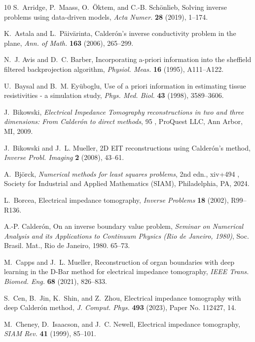 \documentclass[11pt]{article}
\begin{document}
\begin{thebibliography}{10}
	S.~Arridge, P.~Maass, O.~\"Oktem, and C.-B. Sch\"onlieb, Solving inverse
	problems using data-driven models, \textit{Acta Numer.} \textbf{28} (2019),
	1--174.
	
	K.~Astala and L.~P\"aiv\"arinta, Calder\'on's inverse conductivity problem in
	the plane, \textit{Ann. of Math.} \textbf{163} (2006), 265--299.
	
	N.~J. Avis and D.~C. Barber, Incorporating a-priori information into the
	sheffield filtered backprojection algorithm, \textit{Physiol. Meas.}
	\textbf{16} (1995), A111--A122.
	
	U.~Baysal and B.~M. Eyüboglu, Use of a priori information in estimating tissue
	resistivities - a simulation study, \textit{Phys. Med. Biol.} \textbf{43}
	(1998), 3589--3606.
	
	J.~Bikowski, \textit{Electrical {I}mpedance {T}omography reconstructions in two
		and three dimensions: {F}rom {C}alder\'{o}n to direct methods}, 95 , ProQuest
	LLC, Ann Arbor, MI, 2009.
	
	J.~Bikowski and J.~L. Mueller, 2{D} {EIT} reconstructions using {C}alder\'on's
	method, \textit{Inverse Probl. Imaging} \textbf{2} (2008), 43--61.
	
	A.~Bj\"orck, \textit{Numerical methods for least squares problems}, 2nd edn.,
	xiv+494 , Society for Industrial and Applied Mathematics (SIAM),
	Philadelphia, PA, 2024.
	
	L.~Borcea, Electrical impedance tomography, \textit{Inverse Problems}
	\textbf{18} (2002), R99--R136.
	
	A.-P. Calder\'on, On an inverse boundary value problem, \textit{Seminar on
		{N}umerical {A}nalysis and its {A}pplications to {C}ontinuum {P}hysics ({R}io
		de {J}aneiro, 1980)}, Soc. Brasil. Mat., Rio de Janeiro, 1980. 65--73.
	
	M.~Capps and J.~L. Mueller, Reconstruction of organ boundaries with deep
	learning in the {D}-{B}ar method for electrical impedance tomography,
	\textit{IEEE Trans. Biomed. Eng.} \textbf{68} (2021), 826--833.
	
	S.~Cen, B.~Jin, K.~Shin, and Z.~Zhou, Electrical impedance tomography with deep
	{C}alder\'on method, \textit{J. Comput. Phys.} \textbf{493} (2023), Paper No.
	112427, 14.
	
	M.~Cheney, D.~Isaacson, and J.~C. Newell, Electrical impedance tomography,
	\textit{SIAM Rev.} \textbf{41} (1999), 85--101.
	

\end{thebibliography}
\end{document}
